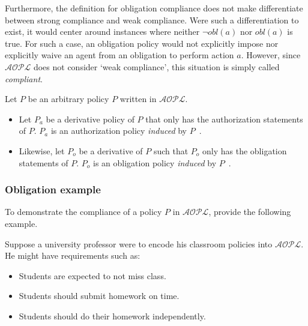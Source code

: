 Furthermore, the definition for obligation compliance does not make differentiate between strong compliance and weak compliance.
Were such a differentiation to exist, it would center around instances where neither $\neg obl(a)$ nor $obl(a)$ is true\footnotemark.
For such a case, an obligation policy would not explicitly impose nor explicitly waive an agent from an obligation to perform action $a$.
However, since $\mathcal{AOPL}$ does not consider `weak compliance', this situation is simply called \textit{compliant}.


\begin{definition}
    Let $P$ be an arbitrary policy $P$ written in $\mathcal{AOPL}$.

    \begin{itemize}
        \item Let $P_a$ be a derivative policy of $P$ that only has the authorization statements of $P$.
            $P_a$ is an authorization policy \textit{induced} by $P$~\citep{gelfond_authorization_2008}.
        \item Likewise, let $P_o$ be a derivative of $P$ such that $P_o$ only has the obligation statements of $P$.
            $P_o$ is an obligation policy \textit{induced} by $P$~\citep{gelfond_authorization_2008}.
    \end{itemize}
\end{definition}

\subsubsection{Obligation example}

To demonstrate the compliance of a policy $P$ in $\mathcal{AOPL}$, \citet{gelfond_authorization_2008} provide the following example.

Suppose a university professor were to encode his classroom policies into $\mathcal{AOPL}$.
He might have requirements such as:

\begin{itemize}
    \item Students are expected to not miss class.
    \item Students should submit homework on time.
    \item Students should do their homework independently.
\end{itemize}

